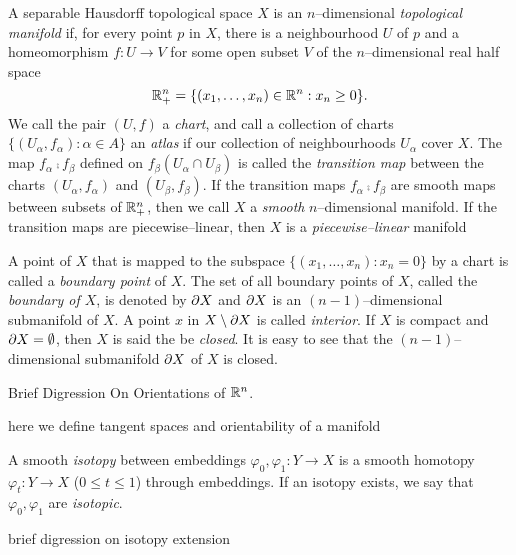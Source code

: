 \begin{defn}
\label{def:manifold}
A separable Hausdorff topological space $X$ is an $n$--dimensional \emph{topological manifold} if, for every point $p$ in $X$, there is a neighbourhood $U$ of $p$ and a homeomorphism $f:U\to V$ for some open subset $V$ of the $n$--dimensional real half space $$\mathbb{R}_+^n=\{(x_1,\dots,x_{n})\in\mathbb{R}^n : x_n\geq 0\}.$$
We call the pair $(U,f)$ a \emph{chart}, and call a collection of charts $\{(U_\alpha,f_\alpha):\alpha\in A\}$ an \emph{atlas} if our collection of neighbourhoods $U_\alpha$ cover $X$.
The map $f_\alpha\comp f_\beta$ defined on $f_\beta(U_\alpha\cap U_\beta)$ is called the \emph{transition map} between the charts $(U_\alpha,f_\alpha)$ and $(U_\beta,f_\beta)$.
If the transition maps $f_\alpha\comp f_\beta$ are smooth maps between subsets of $\mathbb{R}_+^n$, then we call $X$ a \emph{smooth} $n$--dimensional manifold.
If the transition maps are piecewise--linear, then $X$ is a \emph{piecewise--linear} manifold

A point of $X$ that is mapped to the subspace $\{(x_1,\dots,x_n): x_n = 0\}$ by a chart is called a \emph{boundary point} of $X$.
The set of all boundary points of $X$, called the \emph{boundary of $X$}, is denoted by $\partial X$ and $\partial X$ is an $(n-1)$--dimensional submanifold of $X$.
A point $x$ in $X\setminus \partial X$ is called \emph{interior}.
If $X$ is compact and $\partial X=\emptyset$, then $X$ is said the be \emph{closed}.
It is easy to see that the $(n-1)$--dimensional submanifold $\partial X$ of $X$ is closed.

\end{defn}

Brief Digression On Orientations of $\mathbb{R}^n$.

\begin{defn}
\label{def:orient}

here we define tangent spaces and orientability of a manifold

\end{defn}

\begin{defn}
\label{def:isotopy}

A smooth \emph{isotopy} between embeddings $\varphi_0,\varphi_1:Y\to X$ is a smooth homotopy $\varphi_t: Y \to X$ ($0\leq t\leq 1$) through embeddings.
If an isotopy exists, we say that $\varphi_0,\varphi_1$ are \emph{isotopic}.

\end{defn}

brief digression on isotopy extension

